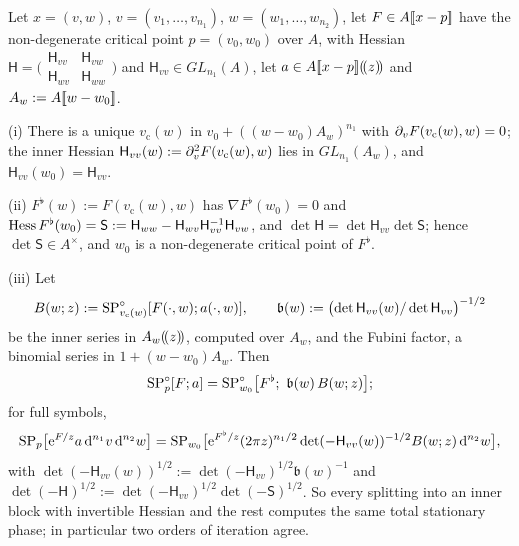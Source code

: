 \begin{lem}
\label{lem:fsp-fubini}
Let $x=(v,w)$, $v=(v_1,\dots,v_{n_1})$, $w=(w_1,\dots,w_{n_2})$, let $F\in A[\![ x-p ]\!]$ have the non-degenerate critical point $p=(v_0,w_0)$ over $A$, with Hessian $\mathsf H=\bigl(\begin{smallmatrix}\mathsf H_{vv}&\mathsf H_{vw}\\ \mathsf H_{wv}&\mathsf H_{ww}\end{smallmatrix}\bigr)$ and $\mathsf H_{vv}\in GL_{n_1}(A)$, let $a\in A[\![ x-p ]\!](\!(z)\!)$ and $A_w:=A[\![ w-w_0 ]\!]$.

(i) There is a unique $v_{\mathrm c}(w)$ in $v_0+((w-w_0)A_w)^{n_1}$ with $\partial_vF(v_{\mathrm c}(w),w)=0$; the inner Hessian $\mathsf H_{vv}(w):=\partial_v^2F(v_{\mathrm c}(w),w)$ lies in $GL_{n_1}(A_w)$, and $\mathsf H_{vv}(w_0)=\mathsf H_{vv}$.

(ii) $F^\flat(w):=F(v_{\mathrm c}(w),w)$ has $\nabla F^\flat(w_0)=0$ and $\operatorname{Hess} F^\flat(w_0)=\mathsf S:=\mathsf H_{ww}-\mathsf H_{wv}\mathsf H_{vv}^{-1}\mathsf H_{vw}$, and $\det\mathsf H=\det\mathsf H_{vv}\det\mathsf S$; hence $\det\mathsf S\in A^\times$, and $w_0$ is a non-degenerate critical point of $F^\flat$.

(iii) Let
\[
B(w;z):=\mathrm{SP}^{\circ}_{v_{\mathrm c}(w)}[F(\cdot,w);a(\cdot,w)],\qquad\mathfrak b(w):=\bigl(\det\mathsf H_{vv}(w)/\det\mathsf H_{vv}\bigr)^{-1/2}
\]
be the inner series in $A_w(\!(z)\!)$, computed over $A_w$, and the Fubini factor, a binomial series in $1+(w-w_0)A_w$. Then
\[
\SPn_p[F;a]=\SPn_{w_0}\bigl[F^\flat;\ \mathfrak b(w)\,B(w;z)\bigr];
\]
for full symbols,
\[
\mathrm{SP}_p\bigl[\mathrm{e}^{F/z}a\,\mathrm{d}^{n_1}v\,\mathrm{d}^{n_2}w\bigr]=\mathrm{SP}_{w_0}\bigl[\mathrm{e}^{F^\flat/z}(2\pi z)^{n_1/2}\det(-\mathsf H_{vv}(w))^{-1/2}B(w;z)\,\mathrm{d}^{n_2}w\bigr],
\]
with $\det(-\mathsf H_{vv}(w))^{1/2}:=\det(-\mathsf H_{vv})^{1/2}\mathfrak b(w)^{-1}$ and $\det(-\mathsf H)^{1/2}:=\det(-\mathsf H_{vv})^{1/2}\det(-\mathsf S)^{1/2}$. So every splitting into an inner block with invertible Hessian and the rest computes the same total stationary phase; in particular two orders of iteration agree.
\end{lem}

